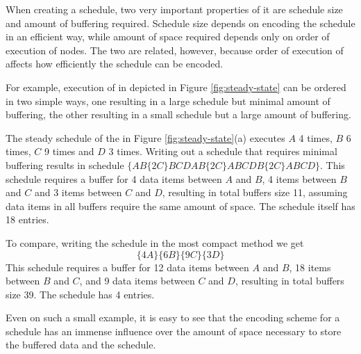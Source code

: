 \begin{comment}
\begin{figure}
\begin{center}

\psfig{figure=pipeline-buffers.eps,width=0.6in} \caption[4 {\filter}
{\pipeline}]{Sample 4 {\filter} {\pipeline}.  This {\pipeline} is
the same as one in Figure \ref{fig:steady-state} (a), except that
its children do not peek extra data} \label{fig:pipeline-buffers}
\end{center}
\end{figure}
\end{comment}

When creating a schedule, two very important properties of it are
schedule size and amount of buffering required.  Schedule size
depends on encoding the schedule in an efficient way, while amount
of space required depends only on order of execution of nodes. The
two are related, however, because order of execution of {\filters}
affects how efficiently the schedule can be encoded.

For example, execution of {\filters} in {\pipeline} depicted in
Figure \ref{fig:steady-state} can be ordered in two simple ways,
one resulting in a large schedule but minimal amount of buffering,
the other resulting in a small schedule but a large amount of
buffering.

The steady schedule of the {\pipeline} in Figure
\ref{fig:steady-state}(a) executes {\filter} $A$ 4 times,
{\filter} $B$ 6 times, {\filter} $C$ 9 times and {\filter} $D$ 3
times. Writing out a schedule that requires minimal buffering
results in schedule $\{AB\{2C\}BCDAB\{2C\}ABCDB\{2C\}ABCD\}$. This
schedule requires a buffer for 4 data items between {\filters} $A$
and $B$, 4 items between $B$ and $C$ and 3 items between $C$ and
$D$, resulting in total buffers size 11, assuming data items in
all buffers require the same amount of space. The schedule itself
has 18 entries.

To compare, writing the schedule in the most compact method we get
$$\{4A\}\{6B\}\{9C\}\{3D\}$$  This schedule requires a buffer for
12 data items between {\filters} $A$ and $B$, 18 items between $B$
and $C$, and 9 data items between $C$ and $D$, resulting in total
buffers size 39.  The schedule has 4 entries.

Even on such a small example, it is easy to see that the encoding
scheme for a schedule has an immense influence over the amount of
space necessary to store the buffered data and the schedule.

